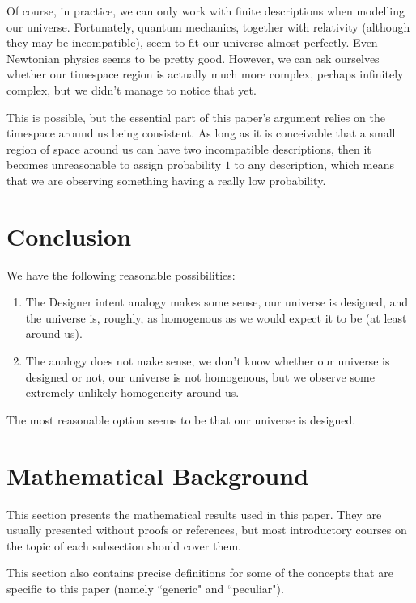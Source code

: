 \documentclass[a4paper
,draft
]{article}
\newcommand{\ghilimele}[1]{``#1"}
\begin{document}
Of course, in practice, we can only work with finite descriptions when
modelling our universe.
Fortunately, quantum mechanics, together with
relativity (although they may be incompatible),
seem to fit our universe almost perfectly.
Even Newtonian physics seems to be pretty good.
However, we can ask ourselves whether our timespace
region is actually much more complex, perhaps infinitely complex,
but we didn't manage to notice that yet.

This is possible, but the essential part of this paper's argument relies on
the timespace around us being consistent.
As long as it is conceivable that
a small region of space around us can have two incompatible descriptions,
then it becomes unreasonable to assign probability $1$ to any description, which
means that we are observing something having a really low probability.

\section{Conclusion}

We have the following reasonable possibilities:

\begin{enumerate}
\item The Designer intent analogy makes some sense, our universe is designed,
      and the universe is, roughly, as homogenous as we would
      expect it to be (at least around us).
\item The analogy does not make sense, we don't know whether our universe is
      designed or not, our universe is not homogenous, but we observe some
      extremely unlikely homogeneity around us.
\end{enumerate}

The most reasonable option seems to be that our universe is designed.

\section{Mathematical Background}
\label{sec:background}

This section presents the mathematical results used in this paper. They are
usually presented without proofs or references, but most introductory courses
on the topic of each subsection should cover them.

This section also contains precise definitions for some of the concepts that
are specific to this paper
(namely \ghilimele{generic} and \ghilimele{peculiar}).
\end{document}
